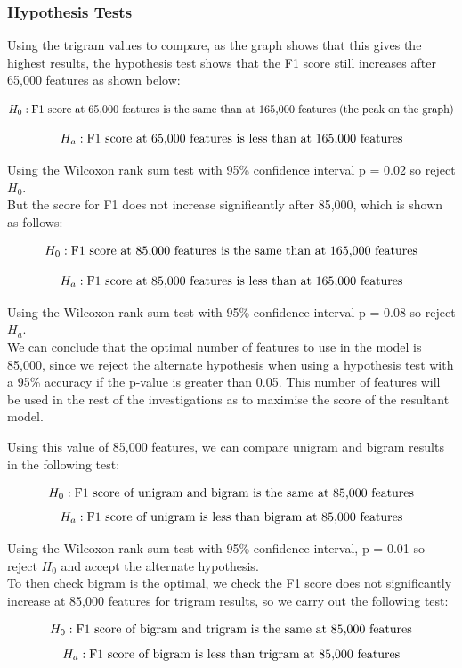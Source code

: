 \subsubsection{Hypothesis Tests}

Using the trigram values to compare, as the graph shows that this gives the highest results, the hypothesis test shows that the F1 score still increases after 65,000 features as shown below:

$$ H_0:  \textnormal{F1 score at 65,000 features is the same than at 165,000 features (the peak on the graph)}$$

$$ H_a: \textnormal{F1 score at 65,000 features is less than at 165,000 features} $$


Using the Wilcoxon rank sum test with 95\% confidence interval p = 0.02 so reject $H_0$.
\\But the score for F1 does not increase significantly after 85,000, which is shown as follows:

$$ H_0:  \textnormal{F1 score at 85,000 features is the same than at 165,000 features}$$

$$ H_a: \textnormal{F1 score at 85,000 features is less than at 165,000 features} $$

Using the Wilcoxon rank sum test with 95\% confidence interval p = 0.08 so reject $H_a$.
\\We can conclude that the optimal number of features to use in the model is 85,000, since we reject the alternate hypothesis when using a hypothesis test with a 95\% accuracy if the p-value is greater than 0.05. This number of features will be used in the rest of the investigations as to maximise the score of the resultant model. 

Using this value of 85,000 features, we can compare unigram and bigram results in the following test:

$$ H_0: \textnormal{F1 score of unigram and bigram is the same at 85,000 features} $$
$$ H_a: \textnormal{F1 score of unigram is less than bigram at 85,000 features} $$

Using the Wilcoxon rank sum test with 95\% confidence interval, p = 0.01 so reject $H_0$ and accept the alternate hypothesis.
\\To then check bigram is the optimal, we check the F1 score does not significantly increase at 85,000 features for trigram results, so we carry out the following test:

$$ H_0: \textnormal{F1 score of bigram and trigram is the same at 85,000 features} $$
$$ H_a: \textnormal{F1 score of bigram is less than trigram at 85,000 features} $$

